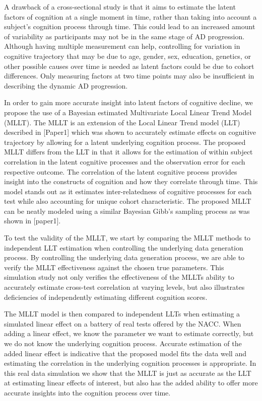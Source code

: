 \documentclass[
]{article}
\begin{document}
A drawback of a cross-sectional study is that it aims to estimate the latent factors of cognition at a single moment in time, rather than taking into account a subject's cognition process through time. This could lead to an increased amount of variability as participants may not be in the same stage of AD progression. Although having multiple measurement can help, controlling for variation in cognitive trajectory that may be due to age, gender, sex, education, genetics, or other possible causes over time is needed as latent factors could be due to cohort differences. Only measuring factors at two time points may also be insufficient in describing the dynamic AD progression.

In order to gain more accurate insight into latent factors of cognitive decline, we propose the use of a Bayesian estimated Multivariate Local Linear Trend Model (MLLT). The MLLT is an extension of the Local Linear Trend model (LLT) described in {[}Paper1{]} which was shown to accurately estimate effects on cognitive trajectory by allowing for a latent underlying cognition process. The proposed MLLT differs from the LLT in that it allows for the estimation of within subject correlation in the latent cognitive processes and the observation error for each respective outcome. The correlation of the latent cognitive process provides insight into the constructs of cognition and how they correlate through time. This model stands out as it estimates inter-relatedness of cognitive processes for each test while also accounting for unique cohort characteristic. The proposed MLLT can be neatly modeled using a similar Bayesian Gibb's sampling process as was shown in {[}paper1{]}.

To test the validity of the MLLT, we start by comparing the MLLT methods to independent LLT estimation when controlling the underlying data generation process. By controlling the underlying data generation process, we are able to verify the MLLT effectiveness against the chosen true parameters. This simulation study not only verifies the effectiveness of the MLLTs ability to accurately estimate cross-test correlation at varying levels, but also illustrates deficiencies of independently estimating different cognition scores.

The MLLT model is then compared to independent LLTs when estimating a simulated linear effect on a battery of real tests offered by the NACC. When adding a linear effect, we know the parameter we want to estimate correctly, but we do not know the underlying cognition process. Accurate estimation of the added linear effect is indicative that the proposed model fits the data well and estimating the correlation in the underlying cognition processes is appropriate. In this real data simulation we show that the MLLT is just as accurate as the LLT at estimating linear effects of interest, but also has the added ability to offer more accurate insights into the cognition process over time.
\end{document}
